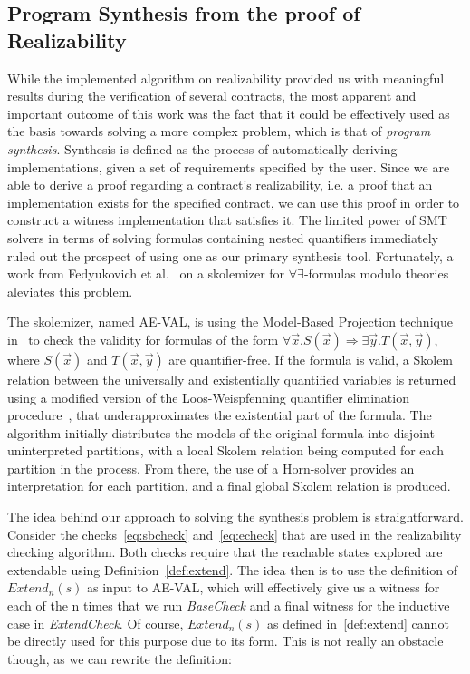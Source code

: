 \subsection{Program Synthesis from the proof of Realizability}

While the implemented algorithm on realizability provided us with meaningful
results during the verification of several contracts, the most apparent and
important outcome of this work was the fact that it could be effectively used as
the basis towards solving a more complex problem, which is that of
\textit{program synthesis}. Synthesis is defined as the process of automatically
deriving implementations, given a set of requirements specified by the user.
Since we are able to derive a proof regarding a contract's realizability,
i.e. a proof that an implementation exists for the specified
contract, we can use this proof in order to construct a witness
implementation that satisfies it. The limited power of SMT solvers
in terms of solving formulas containing nested quantifiers immediately ruled
out the prospect of using one as our primary synthesis tool. Fortunately, a
work from Fedyukovich et al.~\cite{fedyukovichae,fedyukovich2015automated}
on a skolemizer for $\forall\exists$-formulas modulo theories aleviates this
problem.

The skolemizer, named AE-VAL, is using the Model-Based Projection technique
in~\cite{komuravelli2014smt} to check the validity for formulas of the
form $\forall \vec{x}.
S(\vec{x}) \Rightarrow \exists \vec{y}. T(\vec{x},\vec{y})$, where $S(\vec{x})$
and $T(\vec{x},\vec{y})$ are quantifier-free. If the formula is valid, a Skolem
relation between the universally and existentially quantified variables is
returned using a modified version of the Loos-Weispfenning quantifier
elimination procedure~\cite{loos1993applying}, that underapproximates the
existential part of the formula. The algorithm initially distributes the models
of the original formula into disjoint uninterpreted partitions, with a local Skolem
relation being computed for each partition in the process. From there, the use of a
Horn-solver provides an interpretation for each partition, and a final global Skolem relation is produced.

The idea behind our approach to solving the synthesis problem is
straightforward. Consider the checks~\ref{eq:sbcheck} and~\ref{eq:echeck} that
are used in the realizability checking algorithm. Both checks require
that the reachable states explored are extendable using
Definition~\ref{def:extend}.
The idea then is to use the definition of $Extend_{n}(s)$ as input to AE-VAL,
which will effectively give us a witness for each of the n times that we run
\textit{BaseCheck} and a final witness for the inductive case in
\textit{ExtendCheck}. Of course, $Extend_{n}(s)$ as defined in~\ref{def:extend} cannot
be directly used for this purpose due to its form. This is not really an
obstacle though, as we can rewrite the definition:

